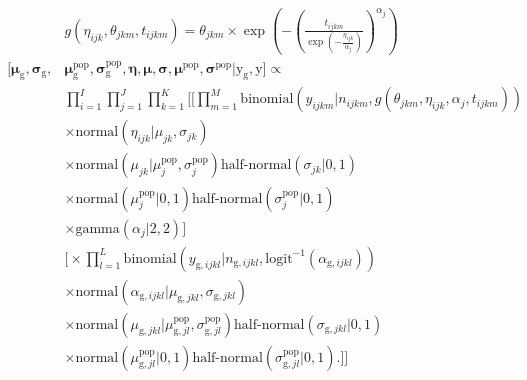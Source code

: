 \documentclass[12pt, oneside, titlepage]{article}   	%
\begin{document}

\begin{align}
  \begin{split}
& g( \eta_{ijk}, \theta_{jkm},  t_{ijkm} )  = \theta_{jkm}  \times \exp(- (\frac{ t_{ijkm} }{ \exp({ - \frac{ \eta_{ijk} }{ \alpha_j}}) })^{\alpha_j}  ) 
 \\  [ \bm{\mu}_\mathrm{g} , \bm{\sigma}_\mathrm{g} , & \bm{\mu}_\mathrm{g}^\mathrm{pop}, \bm{\sigma}_\mathrm{g}^\mathrm{pop} , \bm{\eta} , \bm{\mu} , \bm{\sigma} , \bm{\mu}^\mathrm{pop}, \bm{\sigma}^\mathrm{pop} |  \bm{\mathrm{y}}_\mathrm{g}, \bm{\mathrm{y}}  ]  \propto 
 \\ &   \prod_{i=1}^{I}  \prod_{j=1}^{J} \prod_{k=1}^{K} \Bigg[ \Big[ \prod_{m=1}^{M} 
   \mathrm{binomial} ( y_{ijkm} | n_{ijkm}, g( \theta_{jkm}, \eta_{ijk}, \alpha_j , t_{ijkm} ) ) 
   \\ & \times \mathrm{normal} ( \eta_{ijk}  | \mu_{jk}, \sigma{_{jk} })
  \\ & \times \mathrm{normal} ( \mu_{jk}  | \mu^\mathrm{pop}_{j}, \sigma^\mathrm{pop}_{j} ) \textrm{half-normal} ( \sigma_{jk} | 0,1)
  \\ & \times \mathrm{normal} ( \mu^\mathrm{pop}_{j} | 0 , 1 ) \textrm{half-normal} ( \sigma^\mathrm{pop}_{j} | 0,1)
  \\ & \times \mathrm{gamma} ( \alpha_j | 2 , 2 ) \Big]
  \\ & \Big[ \times \prod_{l=1}^{L} 
   \mathrm{binomial} ( y_{\mathrm{g},ijkl} | n_{\mathrm{g},ijkl}, \mathrm{logit}^{-1}(\alpha_{\mathrm{g},ijkl}) ) 
   \\ & \times \mathrm{normal} ( \alpha_{\mathrm{g},ijkl}  | \mu_{\mathrm{g},jkl}, \sigma{_{\mathrm{g},jkl} })
  \\ & \times \mathrm{normal} ( \mu_{\mathrm{g},jkl}  | \mu^\mathrm{pop}_{\mathrm{g},jl}, \sigma^\mathrm{pop}_{\mathrm{g},jl} ) \textrm{half-normal} ( \sigma_{\mathrm{g},jkl} | 0,1)
  \\ & \times \mathrm{normal} ( \mu^\mathrm{pop}_{\mathrm{g},jl} | 0 , 1 ) \textrm{half-normal} ( \sigma^\mathrm{pop}_{\mathrm{g},jl} | 0,1). \Big] \Bigg] 

\end{split}
\end{align}
\end{document}
